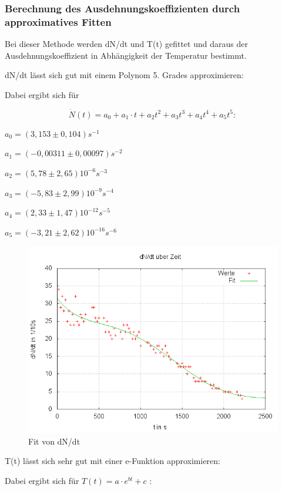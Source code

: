 \subsubsection{Berechnung des Ausdehnungskoeffizienten durch approximatives Fitten}

Bei dieser Methode werden dN/dt und T(t) gefittet und daraus der Ausdehnungskoeffizient in Abhängigkeit der Temperatur bestimmt.

dN/dt lässt sich gut mit einem Polynom 5. Grades approximieren:


Dabei ergibt sich für 


\begin{equation}
\dot{N}(t)=a_{0}+a_{1} \cdot t+a_{2}t^{2}+a_{3}t^{3}+a_{4}t^{4}+a_{5}t^{5} :
\end{equation}

$
 a_{0} =(3,153 \pm 0,104) s^{-1} 
$

$
a_{1}=(-0,00311 \pm 0,00097)s^{-2}
$

$
a_{2}=(5,78 \pm 2,65)10^{-6}s^{-3}
$

$
a_{3}=(-5,83 \pm 2,99)10^{-9}s^{-4}
$

$
a_{4}=(2,33 \pm 1,47)10^{-12}s^{-5}
$

$
a_{5}=(-3,21 \pm 2,62)10^{-16}s^{-6} 
$\\



\begin{figure}
\centering
        \includegraphics[width=.8\textwidth]{images/Fit_dNdt(t).png}
\caption{Fit von dN/dt}
\label{Fit dNdt(t)}
\end{figure}


T(t) lässt sich sehr gut mit einer e-Funktion approximieren:

Dabei ergibt sich für $ T(t) = a \cdot e^{bt} + c $ :

